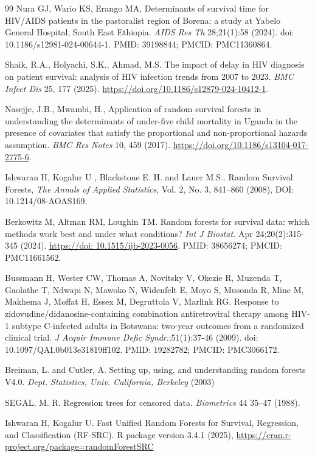 \documentclass[10pt]{NSP1}
\begin{document}
\begin{thebibliography}{99}
Nura GJ, Wario KS, Erango MA, Determinants of survival time for HIV/AIDS patients in the pastoralist region of Borena: a study at Yabelo General Hospital, South East Ethiopia. \textit{AIDS Res Th} 28;21(1):58 (2024). doi: 10.1186/s12981-024-00644-1. PMID: 39198844; PMCID: PMC11360864.

Shaik, R.A., Holyachi, S.K., Ahmad, M.S. The impact of delay in HIV diagnosis on patient survival: analysis of HIV infection trends from 2007 to 2023. \textit{BMC Infect Dis} 25, 177 (2025). \url{https://doi.org/10.1186/s12879-024-10412-1}.

Nasejje, J.B., Mwambi, H., Application of random survival forests in understanding the determinants of under-five child mortality in Uganda in the presence of covariates that satisfy the proportional and non-proportional hazards assumption. \textit{BMC Res Notes} 10, 459 (2017). \url{https://doi.org/10.1186/s13104-017-2775-6}.

Ishwaran H, Kogalur U , Blackstone  E. H. and Lauer M.S.. Random Survival Forests, \textit{The Annals of Applied Statistics}, Vol. 2, No. 3, 841–860 (2008), DOI: 10.1214/08-AOAS169.

Berkowitz M, Altman RM, Loughin TM. Random forests for survival data: which methods work best and under what conditions? \textit{Int J Biostat.} Apr 24;20(2):315-345 (2024). \url{https://doi: 10.1515/ijb-2023-0056}. PMID: 38656274; PMCID: PMC11661562.

Bussmann H, Wester CW, Thomas A, Novitsky V, Okezie R, Muzenda T, Gaolathe T, Ndwapi N, Mawoko N, Widenfelt E, Moyo S, Musonda R, Mine M, Makhema J, Moffat H, Essex M, Degruttola V, Marlink RG. Response to zidovudine/didanosine-containing combination antiretroviral therapy among HIV-1 subtype C-infected adults in Botswana: two-year outcomes from a randomized clinical trial. \textit{J Acquir Immune Defic Syndr}.;51(1):37-46 (2009). doi: 10.1097/QAI.0b013e31819ff102. PMID: 19282782; PMCID: PMC3066172.

Breiman, L. and Cutler, A. Setting up, using, and understanding random forests V4.0. \textit{Dept. Statistics, Univ. California, Berkeley} (2003)

SEGAL, M. R. Regression trees for censored data. \textit{Biometrics} 44 35–47 (1988).

Ishwaran H, Kogalur U. Fast Unified Random Forests for Survival, Regression, and Classification (RF-SRC). R package version 3.4.1 (2025), \url{https://cran.r-project.org/package=randomForestSRC}

\end{thebibliography}
\end{document}
